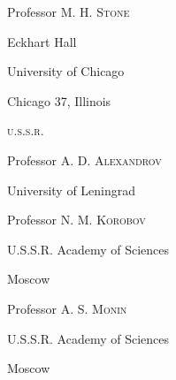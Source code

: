 \quad Professor \textsc{M. H. Stone}

\quad Eckhart Hall

\quad University of Chicago

\quad Chicago 37, Illinois
\medskip

\noindent
\textsc{u.s.s.r.}

\quad Professor \textsc{A. D. Alexandrov}

\quad University of Leningrad
\smallskip

\quad Professor \textsc{N. M. Korobov}

\quad U.S.S.R. Academy of Sciences

\quad Moscow
\smallskip

\quad Professor \textsc{A. S. Monin}

\quad U.S.S.R. Academy of Sciences

\quad Moscow
